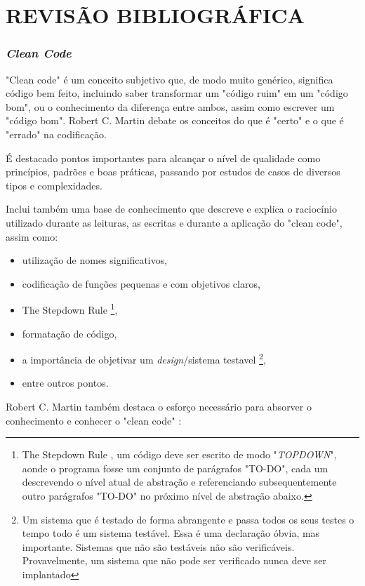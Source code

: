 \documentclass[12pt]{article}
\begin{document}
\part{REVISÃO BIBLIOGRÁFICA} \label{sec:revisaobibliografica}
\section{\textit{Clean Code}} \label{sec:cleancode}

"Clean code" \cite{ROBERT_MARTIN_CLEAN_CODE} é um conceito subjetivo que, de modo muito genérico, significa código bem feito, incluindo saber transformar um "código ruim" em um "código bom", ou o conhecimento da diferença entre ambos, assim como escrever um "código bom". Robert C. Martin \cite{ROBERT_MARTIN_CLEAN_CODE} debate os conceitos do que é "certo" e o que é "errado" na codificação.

É destacado pontos importantes para alcançar o nível de qualidade como princípios, padrões e boas práticas, passando por estudos de casos de diversos tipos e complexidades.

Inclui também uma base de conhecimento que descreve e explica o raciocínio utilizado durante as leituras, as escritas e durante a aplicação do "clean code", assim como:
\begin{itemize}
 \item utilização de nomes significativos,
 \item codificação de funções pequenas e com objetivos claros,
 \item The Stepdown Rule \footnote{The Stepdown Rule \cite{ROBERT_MARTIN_CLEAN_CODE}, um código deve ser escrito de modo "\textit{TOPDOWN}", aonde o programa fosse um conjunto de parágrafos "TO-DO", cada um descrevendo o nível atual de abstração e referenciando subsequentemente outro parágrafos "TO-DO" no próximo nível de abstração abaixo.},
 \item formatação de código,
 \item a importância de objetivar um \textit{design}/sistema testavel \footnote{Um sistema que é testado de forma abrangente e passa todos os seus testes o tempo todo é um sistema testável. Essa é uma declaração óbvia, mas importante. Sistemas que não são testáveis
não são verificáveis. Provavelmente, um sistema que não pode ser verificado nunca deve ser implantado},
 \item entre outros pontos.
\end{itemize}
Robert C. Martin \cite{ROBERT_MARTIN_CLEAN_CODE} também destaca o esforço necessário para absorver o conhecimento e conhecer o "clean code" \cite{ROBERT_MARTIN_CLEAN_CODE}:
\end{document}
